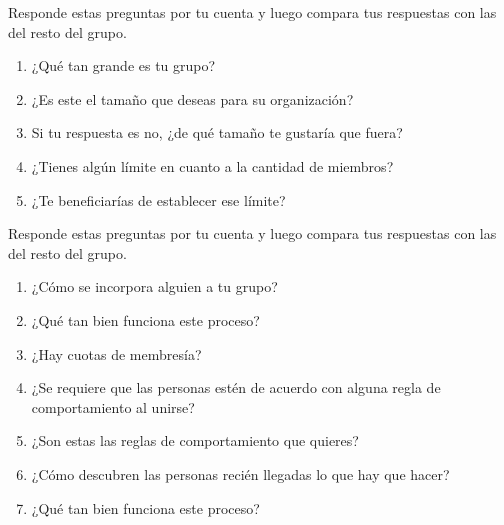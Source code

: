 
Responde estas preguntas por tu cuenta y
luego compara tus respuestas con las del resto del grupo.


\begin{enumerate}

\item
¿Qué tan grande es tu grupo?

\item
  ¿Es este el tamaño que deseas para su organización?

\item
  Si tu respuesta es no, ¿de qué tamaño te gustaría que fuera?

\item
  ¿Tienes algún límite en cuanto a la cantidad de miembros?

\item
  ¿Te beneficiarías de establecer ese límite?

\end{enumerate}


Responde estas preguntas por tu cuenta y
luego compara tus respuestas con las del resto del grupo.


\begin{enumerate}

\item
  ¿Cómo se incorpora alguien a tu grupo?

\item
  ¿Qué tan bien funciona este proceso?

\item
    ¿Hay cuotas de membresía?

\item
  ¿Se requiere que las personas estén de acuerdo con alguna regla de comportamiento al unirse?

\item
  ¿Son estas las reglas de comportamiento que quieres?

\item
  ¿Cómo descubren las personas recién llegadas lo que hay que hacer?

\item
  ¿Qué tan bien funciona este proceso?
 
\end{enumerate}


